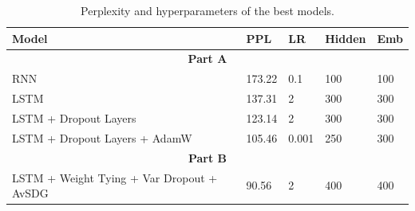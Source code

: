\documentclass[a4paper]{article}
\begin{document}
\begin{table}[h!]
  \centering
  \begin{tabular}{l p{1 cm} p{1 cm} p{1 cm} p{1 cm}}
      \midrule
      \textbf{Model} & \textbf{PPL} & \textbf{LR} & \textbf{Hidden} & \textbf{Emb} \\
      \midrule
      \multicolumn{5}{c}{\textbf{Part A}} \\
      RNN                     & 173.22 & 0.1    & 100 & 100 \\
      LSTM                    & 137.31 & 2      & 300 & 300 \\
      LSTM + Dropout Layers      & 123.14 & 2      & 300 & 300 \\
      LSTM + Dropout Layers + AdamW & 105.46 & 0.001 & 250 & 300 \\
      \midrule
      \multicolumn{5}{c}{\textbf{Part B}} \\
      \midrule
      LSTM + Weight Tying + Var Dropout + AvSDG & 90.56 & 2 & 400 & 400 \\
      \bottomrule
  \end{tabular}
  \caption{Perplexity and hyperparameters of the best models.}
  \label{tab:results}
\end{table}





\end{document}
